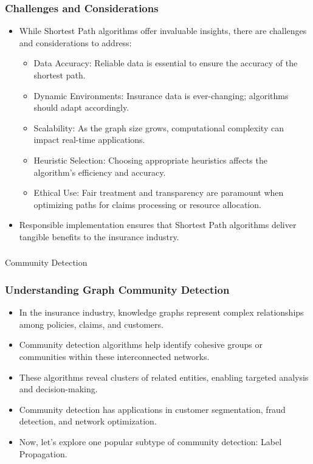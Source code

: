 \begin{frame}[fragile]\frametitle{Challenges and Considerations}
\begin{itemize}
\item While Shortest Path algorithms offer invaluable insights, there are challenges and considerations to address:
\begin{itemize}
\item Data Accuracy: Reliable data is essential to ensure the accuracy of the shortest path.
\item Dynamic Environments: Insurance data is ever-changing; algorithms should adapt accordingly.
\item Scalability: As the graph size grows, computational complexity can impact real-time applications.
\item Heuristic Selection: Choosing appropriate heuristics affects the algorithm's efficiency and accuracy.
\item Ethical Use: Fair treatment and transparency are paramount when optimizing paths for claims processing or resource allocation.
\end{itemize}
\item Responsible implementation ensures that Shortest Path algorithms deliver tangible benefits to the insurance industry.
\end{itemize}
\end{frame}


\begin{frame}[fragile]\frametitle{}
\begin{center}
{\Large Community Detection}
\end{center}
\end{frame}

\begin{frame}[fragile]\frametitle{Understanding Graph Community Detection}
\begin{itemize}
\item In the insurance industry, knowledge graphs represent complex relationships among policies, claims, and customers.
\item Community detection algorithms help identify cohesive groups or communities within these interconnected networks.
\item These algorithms reveal clusters of related entities, enabling targeted analysis and decision-making.
\item Community detection has applications in customer segmentation, fraud detection, and network optimization.
\item Now, let's explore one popular subtype of community detection: Label Propagation.
\end{itemize}
\end{frame}

